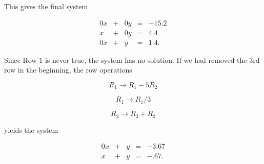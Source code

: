 \documentclass{ximera}
\begin{document}
\begin{solution}
            This gives the final system
    
            $$\begin{array}{ccccc}
                    0x & +&0y&=&-15.2 \\
                    x& +&0y&=&4.4 \\
                    0x& +&y&=&1.4.
                \end{array}$$
    
            Since Row 1 is never true, the system has no solution. If we had removed the 3rd row in the beginning, the row operations 
    
            $$R_1\rightarrow R_1-5R_2$$
    
            $$R_1\rightarrow R_1/3$$
    
            $$R_2\rightarrow R_2+R_2$$
    
            yields the system
    
            $$\begin{array}{ccccc}
                    0x & +&y&=&-3.67 \\
                    x& +&y&=&-.67.
                \end{array}$$
    
        \end{solution}
    
    
\end{document}

